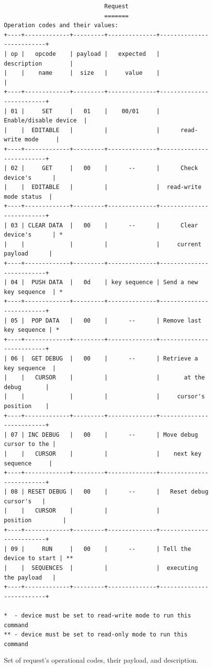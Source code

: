 \begin{figure}[ht]
\label{fig:communication_protocol_request}
\centering
\begin{varwidth}{\linewidth}
\begin{small}
\begin{verbatim}
                             Request
                             =======
Operation codes and their values:
+----+-------------+---------+--------------+--------------------------+
| op |   opcode    | payload |   expected   |       description        |
|    |    name     |  size   |     value    |                          |
+----+-------------+---------+--------------+--------------------------+
| 01 |     SET     |   01    |    00/01     |   Enable/disable device  |
|    |  EDITABLE   |         |              |      read-write mode     |
+----+-------------+---------+--------------+--------------------------+
| 02 |     GET     |   00    |      --      |      Check device's      |
|    |  EDITABLE   |         |              |  read-write mode status  |
+----+-------------+---------+--------------+--------------------------+
| 03 | CLEAR DATA  |   00    |      --      |      Clear device's      | *
|    |             |         |              |     current payload      |
+----+-------------+---------+--------------+--------------------------+
| 04 |  PUSH DATA  |   0d    | key sequence | Send a new key sequence  | *
+----+-------------+---------+--------------+--------------------------+
| 05 |  POP DATA   |   00    |      --      | Remove last key sequence | *
+----+-------------+---------+--------------+--------------------------+
| 06 |  GET DEBUG  |   00    |      --      | Retrieve a key sequence  |
|    |   CURSOR    |         |              |       at the debug       |
|    |             |         |              |     cursor's position    |
+----+-------------+---------+--------------+--------------------------+
| 07 | INC DEBUG   |   00    |      --      | Move debug cursor to the |
|    |   CURSOR    |         |              |    next key sequence     |
+----+-------------+---------+--------------+--------------------------+
| 08 | RESET DEBUG |   00    |      --      |   Reset debug cursor's   |
|    |   CURSOR    |         |              |         position         |
+----+-------------+---------+--------------+--------------------------+
| 09 |     RUN     |   00    |      --      | Tell the device to start | **
|    |  SEQUENCES  |         |              |  executing the payload   |
+----+-------------+---------+--------------+--------------------------+

*  - device must be set to read-write mode to run this command
** - device must be set to read-only mode to run this command
\end{verbatim}
\end{small}
\end{varwidth}
\caption{Set of request's operational codes, their payload, and description.} 
\end{figure}

